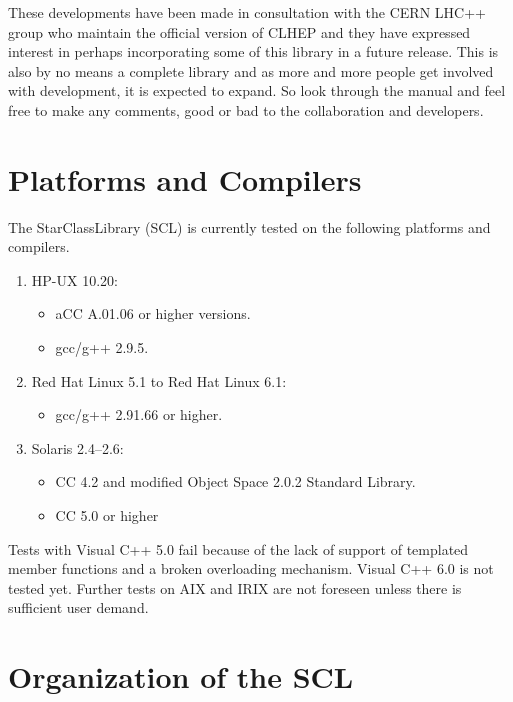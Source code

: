 \documentclass[twoside]{article}
\newcommand{\name}[1]{\textsf{#1}}%
\begin{document}
These developments have been made in consultation with the CERN LHC++
group who maintain the official version of CLHEP and they have
expressed interest in perhaps incorporating some of this library
in a future release.  This is also by no means a complete library and as
more and more people get involved with development, it is expected to
expand.  So look through the manual and feel free to
make any comments, good or bad to the collaboration and developers.



\section{Platforms and Compilers}  
\label{platformsAndCompilers}

The \name{StarClassLibrary} (SCL)  is currently tested on the
following platforms and compilers.
\begin{enumerate}
\item HP-UX 10.20: 
  \begin{itemize}
    \item aCC A.01.06 or higher versions. 
    \item gcc/g++ 2.9.5.
  \end{itemize}
\item Red Hat Linux 5.1 to Red Hat Linux 6.1: 
  \begin{itemize}
    \item gcc/g++ 2.91.66 or higher. 
  \end{itemize}
\item Solaris 2.4--2.6: 
  \begin{itemize}
    \item CC 4.2 and modified Object Space 2.0.2 Standard Library. 
    \item CC 5.0 or higher
  \end{itemize}
\end{enumerate}
Tests with Visual C++ 5.0 fail because of the lack of support of 
templated member functions and a broken overloading mechanism. Visual C++ 6.0 is not
tested yet.
Further tests on AIX and IRIX are not foreseen unless there is sufficient user demand.
 

\section{Organization of the SCL}
\end{document}

